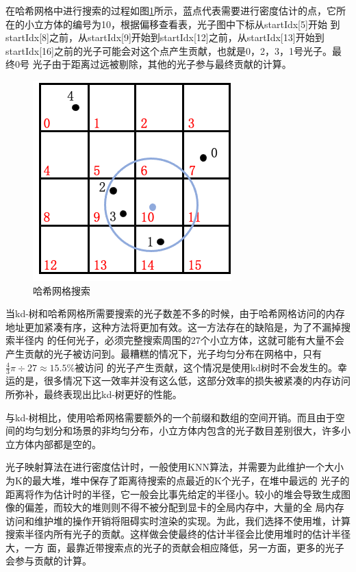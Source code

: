 \documentclass[UTF8]{ctexart}
\begin{document}
        在哈希网格中进行搜索的过程如图\ref{fig:2}所示，蓝点代表需要进行密度估计的点，它所在的小立方体的编号为10，根据偏移查看表，光子图中下标从startIdx[5]开始
        到startIdx[8]之前，从startIdx[9]开始到startIdx[12]之前，从startIdx[13]开始到startIdx[16]之前的光子可能会对这个点产生贡献，也就是0，2，3，1号光子。最终0号
        光子由于距离过远被剔除，其他的光子参与最终贡献的计算。
        
        \begin{figure}[htbp]
        \centering
        \includegraphics[scale=0.6]{pic/HashGridSearch.png}
        \caption{哈希网格搜索}
        \label{fig:2}
        \end{figure}
        
        当kd-树和哈希网格所需要搜索的光子数差不多的时候，由于哈希网格访问的内存地址更加紧凑有序，这种方法将更加有效。这一方法存在的缺陷是，为了不漏掉搜索半径内
        的任何光子，必须完整搜索周围的27个小立方体，这就可能有大量不会产生贡献的光子被访问到。最糟糕的情况下，光子均匀分布在网格中，只有$\frac{4}{3}\pi\div27\approx15.5\%$被访问
        的光子产生贡献，这个情况是使用kd树时不会发生的。幸运的是，很多情况下这一效率并没有这么低，这部分效率的损失被紧凑的内存访问所弥补，最终表现出比kd-树更好的性能。
        
        与kd-树相比，使用哈希网格需要额外的一个前缀和数组的空间开销。而且由于空间的均匀划分和场景的非均匀分布，小立方体内包含的光子数目差别很大，许多小立方体内部都是空的。
        
        光子映射算法在进行密度估计时，一般使用KNN算法，并需要为此维护一个大小为K的最大堆\cite{jensen2000practical}，堆中保存了距离待搜索的点最近的K个光子，在堆中最远的
        光子的距离将作为估计时的半径，它一般会比事先给定的半径小\cite{2003Photon}。较小的堆会导致生成图像的偏差，而较大的堆则则不得不被分配到显卡的全局内存中，大量的全
        局内存访问和维护堆的操作开销将阻碍实时渲染的实现。为此，我们选择不使用堆，计算搜索半径内所有光子的贡献。这样做会使最终的估计半径会比使用堆时的估计半径大，一方
        面，最靠近带搜索点的光子的贡献会相应降低，另一方面，更多的光子会参与贡献的计算。
\end{document}
